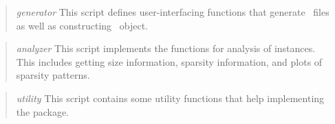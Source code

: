 \begin{quotation}
	\noindent\textit{generator} This script defines user-interfacing functions that generate \smps\ files as well as constructing \jumpmodel\ object.
\end{quotation}

\begin{quotation}
	\noindent\textit{analyzer} This script implements the functions for analysis of instances. This includes getting size information, sparsity information, and plots of sparsity patterns.
\end{quotation}

\begin{quotation}
	\noindent\textit{utility} This script contains some utility functions that help implementing the package.
\end{quotation}



